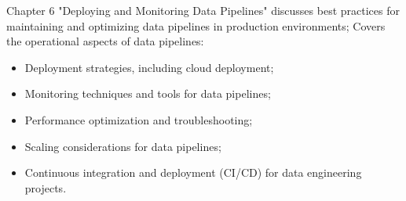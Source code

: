Chapter 6 "Deploying and Monitoring Data Pipelines" discusses best practices for maintaining and optimizing data pipelines in production environments; Covers the operational aspects of data pipelines: 

\begin{itemize}
    \item Deployment strategies, including cloud deployment;
    \item Monitoring techniques and tools for data pipelines;
    \item Performance optimization and troubleshooting;
    \item Scaling considerations for data pipelines;
    \item Continuous integration and deployment (CI/CD) for data engineering projects.
\end{itemize}